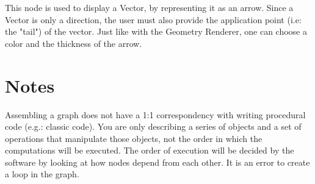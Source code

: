 This node is used to display a Vector, by representing it as an arrow.
Since a Vector is only a direction, the user must also provide the application point (i.e: the "tail") of the vector.
Just like with the Geometry Renderer, one can choose a color and the thickness of the arrow.

\section{Notes}
Assembling a graph does not have a 1:1 correspondency with writing procedural
code (e.g.: classic \CC{} code). You are only describing a series of
objects and a set of operations that manipulate those objects, not the order
in which the computations will be executed. The order of execution will be
decided by the software by looking at how nodes depend from each other.
It is an error to create a loop in the graph.

